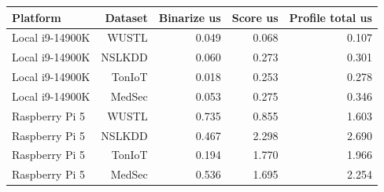 \begin{tabular}{lrrrr}
\toprule
Platform & Dataset & Binarize us & Score us & Profile total us \\
\midrule
Local i9-14900K & WUSTL & 0.049 & 0.068 & 0.107 \\
Local i9-14900K & NSLKDD & 0.060 & 0.273 & 0.301 \\
Local i9-14900K & TonIoT & 0.018 & 0.253 & 0.278 \\
Local i9-14900K & MedSec & 0.053 & 0.275 & 0.346 \\
Raspberry Pi 5 & WUSTL & 0.735 & 0.855 & 1.603 \\
Raspberry Pi 5 & NSLKDD & 0.467 & 2.298 & 2.690 \\
Raspberry Pi 5 & TonIoT & 0.194 & 1.770 & 1.966 \\
Raspberry Pi 5 & MedSec & 0.536 & 1.695 & 2.254 \\
\bottomrule
\end{tabular}

